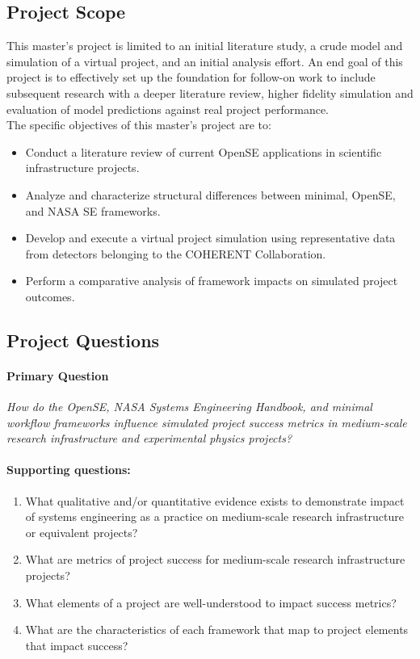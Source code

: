 \subsection{Project Scope}
\label{sub:scope}
This master’s project is limited to an initial literature study, a crude model and simulation of a virtual project, and an initial analysis effort. 
An end goal of this project is to effectively set up the foundation for follow-on work to include subsequent research with a deeper literature review, higher fidelity simulation and evaluation of model predictions against real project performance.\\
The specific objectives of this master’s project are to:
\begin{itemize}[noitemsep, topsep=0pt]
    \item Conduct a literature review of current OpenSE applications in scientific infrastructure projects.
    \item Analyze and characterize structural differences between minimal, OpenSE, and NASA SE frameworks.
    \item Develop and execute a virtual project simulation using representative data from detectors belonging to the COHERENT Collaboration.
    \item Perform a comparative analysis of framework impacts on simulated project outcomes.
\end{itemize}
\subsection{Project Questions}
\label{sub:primaryQuestion}
\paragraph{Primary Question}
\begin{center}
\textit{How do the OpenSE, NASA Systems Engineering Handbook, and minimal workflow frameworks influence simulated project success metrics in medium-scale research infrastructure and experimental physics projects?}
\end{center}
\paragraph{Supporting questions:}
\begin{enumerate}[noitemsep, topsep=0pt]
    \item What qualitative and/or quantitative evidence exists to demonstrate impact of systems engineering as a practice on medium-scale research infrastructure or equivalent projects?
    \item What are metrics of project success for medium-scale research infrastructure projects?
    \item What elements of a project are well-understood to impact success metrics?
    \item What are the characteristics of each framework that map to project elements that impact success?
\end{enumerate}